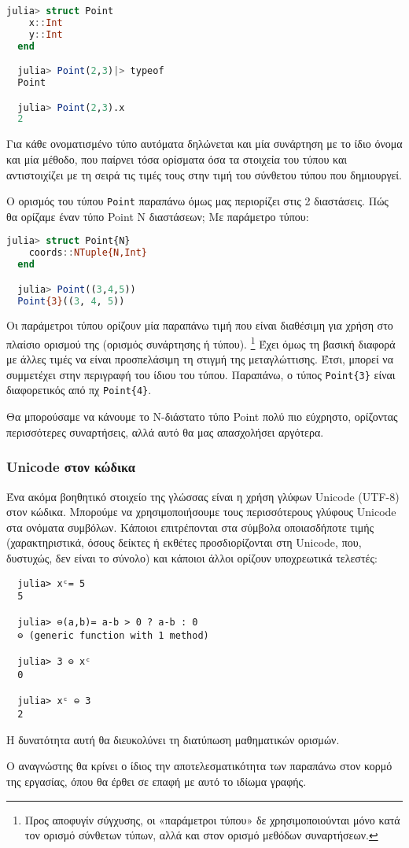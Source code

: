   \begin{lstlisting}[language=julia]
  julia> struct Point
    x::Int
    y::Int
  end

  julia> Point(2,3)|> typeof
  Point

  julia> Point(2,3).x
  2
  \end{lstlisting}

  Για κάθε ονοματισμένο τύπο αυτόματα δηλώνεται και μία συνάρτηση με το ίδιο όνομα και μία μέθοδο,
  που παίρνει τόσα ορίσματα όσα τα στοιχεία του τύπου και αντιστοιχίζει με τη σειρά τις τιμές τους στην τιμή του σύνθετου τύπου που δημιουργεί.

  Ο ορισμός του τύπου \verb|Point| παραπάνω όμως μας περιορίζει στις 2 διαστάσεις.
  Πώς θα ορίζαμε έναν τύπο Point Ν διαστάσεων; Με παράμετρο τύπου:

  \begin{lstlisting}[language=julia]
  julia> struct Point{N}
    coords::NTuple{N,Int}
  end

  julia> Point((3,4,5))
  Point{3}((3, 4, 5))
  \end{lstlisting}

  Οι παράμετροι τύπου ορίζουν μία παραπάνω τιμή που είναι διαθέσιμη για χρήση στο πλαίσιο ορισμού της (ορισμός συνάρτησης ή τύπου).
  \footnote{Προς αποφυγίν σύγχυσης, οι «παράμετροι τύπου» δε χρησιμοποιούνται μόνο
  κατά τον ορισμό σύνθετων τύπων, αλλά και στον ορισμό μεθόδων συναρτήσεων.}
  Έχει όμως τη βασική διαφορά με άλλες τιμές να είναι προσπελάσιμη τη στιγμή της μεταγλώττισης.
  Έτσι, μπορεί να συμμετέχει στην περιγραφή του ίδιου του τύπου.
  Παραπάνω, ο τύπος \verb|Point{3}| είναι διαφορετικός από πχ \verb|Point{4}|.

  Θα μπορούσαμε να κάνουμε το Ν-διάστατο τύπο Point πολύ πιο εύχρηστο, ορίζοντας περισσότερες συναρτήσεις,
  αλλά αυτό θα μας απασχολήσει αργότερα.

  \subsubsection{Unicode στον κώδικα}

  Ένα ακόμα βοηθητικό στοιχείο της γλώσσας είναι η χρήση γλύφων Unicode (UTF-8) στον κώδικα.
  Μπορούμε να χρησιμοποιήσουμε τους περισσότερους γλύφους Unicode στα ονόματα συμβόλων.
  Κάποιοι επιτρέπονται στα σύμβολα οποιασδήποτε τιμής (χαρακτηριστικά, όσους δείκτες ή εκθέτες προσδιορίζονται στη Unicode, που, δυστυχώς, δεν είναι το σύνολο)
  και κάποιοι άλλοι ορίζουν υποχρεωτικά τελεστές:

  \begin{lstlisting}
  julia> xᶜ= 5
  5

  julia> ⊖(a,b)= a-b > 0 ? a-b : 0
  ⊖ (generic function with 1 method)

  julia> 3 ⊖ xᶜ
  0

  julia> xᶜ ⊖ 3
  2
  \end{lstlisting}

  Η δυνατότητα αυτή θα διευκολύνει τη διατύπωση μαθηματικών ορισμών.

  Ο αναγνώστης θα κρίνει ο ίδιος την αποτελεσματικότητα των παραπάνω στον κορμό της εργασίας, όπου θα έρθει σε επαφή με αυτό το ιδίωμα γραφής.
